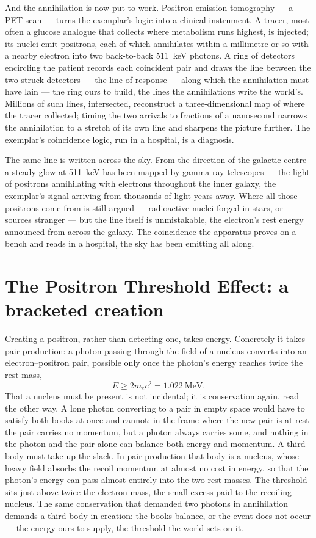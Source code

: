 And the annihilation is now put to work. Positron emission tomography --- a PET scan --- turns the exemplar's
logic into a clinical instrument. A tracer, most often a glucose analogue that collects where metabolism runs
highest, is injected; its nuclei emit positrons, each of which annihilates within a millimetre or so with a
nearby electron into two back-to-back 511~keV photons. A ring of detectors encircling the patient records each
coincident pair and draws the line between the two struck detectors --- the line of response --- along which
the annihilation must have lain --- the ring ours to build, the lines the annihilations write the world's.
Millions of such lines, intersected, reconstruct a three-dimensional map of
where the tracer collected; timing the two arrivals to fractions of a nanosecond narrows the annihilation to a
stretch of its own line and sharpens the picture further. The exemplar's coincidence logic, run in a hospital,
is a diagnosis.

The same line is written across the sky. From the direction of the galactic centre a steady glow at 511~keV has
been mapped by gamma-ray telescopes --- the light of positrons annihilating with electrons throughout the inner
galaxy, the exemplar's signal arriving from thousands of light-years away. Where all those positrons come from
is still argued --- radioactive nuclei forged in stars, or sources stranger --- but the line itself is
unmistakable, the electron's rest energy announced from across the galaxy. The coincidence the apparatus proves
on a bench and reads in a hospital, the sky has been emitting all along.

\section{The Positron Threshold Effect: a bracketed creation}
\label{se:positron-threshold}

Creating a positron, rather than detecting one, takes energy. Concretely it takes pair production: a photon
passing through the field of a nucleus converts into an electron--positron pair, possible only once the
photon's energy reaches twice the rest mass,
\begin{equation}
  E \ge 2 m_e c^2 = 1.022~\mathrm{MeV} .
\end{equation}
That a nucleus must be present is not incidental; it is conservation again, read the other way. A lone photon
converting to a pair in empty space would have to satisfy both books at once and cannot: in the frame where the
new pair is at rest the pair carries no momentum, but a photon always carries some, and nothing in the photon
and the pair alone can balance both energy and momentum. A third body must take up the slack. In pair
production that body is a nucleus, whose heavy field absorbs the recoil momentum at almost no cost in energy, so
that the photon's energy can pass almost entirely into the two rest masses. The threshold sits just above twice
the electron mass, the small excess paid to the recoiling nucleus. The same conservation that demanded two
photons in annihilation demands a third body in creation: the books balance, or the event does not occur ---
the energy ours to supply, the threshold the world sets on it.


